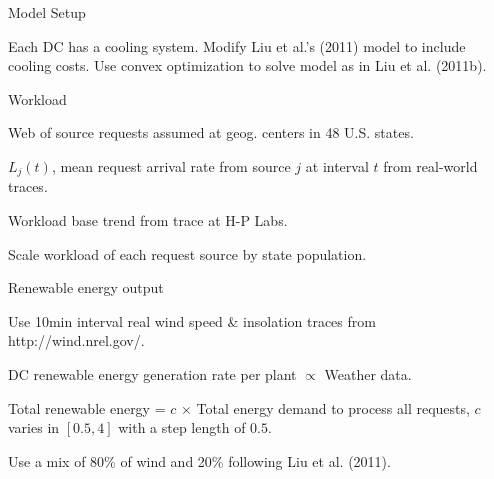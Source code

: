 \documentclass[xcolor=dvipsnames]{beamer}
\begin{document}
\begin{frame}{Model Setup}

Each DC has a cooling system. %
Modify Liu et al.'s (2011) %
model to include cooling costs. Use convex optimization to solve model as in Liu et al. (2011b). %

	\begin{block}{Workload}

	Web of source requests assumed at geog. centers in 48 U.S. states. 

	$L_j(t)$, mean request arrival rate from source $j$ at interval $t$ from real-world traces.

	Workload base trend from trace at H-P Labs.

	Scale workload of each request source by state population. 

	\end{block}

	\begin{block}{Renewable energy output} 

            Use 10min interval real wind speed \& insolation traces from http://wind.nrel.gov/.  %

	\vspace{1mm}
           DC renewable energy generation rate per plant $\propto$   Weather data.

	Total renewable energy =  $c$ $\times$ Total energy demand to process all requests, 	$c$ varies in $[0.5, 4]$ with a step length of $0.5$.

	 Use a mix of 80\% of wind and 20\% following Liu et al. (2011). %
	\end{block}
\end{frame}
\end{document}
